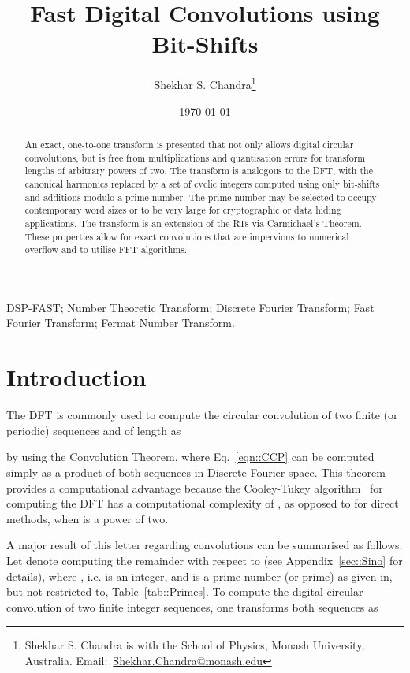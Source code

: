 \documentclass[twocolumn]{IEEEtran}
\title{Fast Digital Convolutions using Bit-Shifts}
\author{Shekhar S. Chandra\thanks{Shekhar S. Chandra is with the School of Physics, Monash University, Australia. Email:~\href{mailto:Shekhar.Chandra@monash.edu}{Shekhar.Chandra@monash.edu}}}
\date{\today}
\newcommand{\eqnTag}{Eq.}
\newcommand{\tabTag}{Table}
\begin{document}
\maketitle
\acresetall

\begin{abstract}
An exact, one-to-one transform is presented that not only allows digital circular convolutions, but is free from multiplications and quantisation errors for transform lengths of arbitrary powers of two. The transform is analogous to the \acl{DFT}, with the canonical harmonics replaced by a set of cyclic integers computed using only bit-shifts and additions modulo a prime number. The prime number may be selected to occupy contemporary word sizes or to be very large for cryptographic or data hiding applications. The transform is an extension of the \aclp{RT} via Carmichael's Theorem. These properties allow for exact convolutions that are impervious to numerical overflow and to utilise \acl{FFT} algorithms.









\end{abstract}

\begin{IEEEkeywords}
DSP-FAST; Number Theoretic Transform; Discrete Fourier Transform; Fast Fourier Transform; Fermat Number Transform.
\end{IEEEkeywords}

\acresetall \section{Introduction}\label{sec::Intro}
The \ac{DFT} is commonly used to compute the circular convolution  of two finite (or periodic) sequences  and  of length  as

by using the Convolution Theorem, where \eqnTag~\eqref{eqn::CCP} can be computed simply as a product of both sequences in Discrete Fourier space. This theorem provides a computational advantage because the Cooley-Tukey algorithm~\citep{Cooley1965} for computing the \ac{DFT} has a computational complexity of , as opposed to  for direct methods, when  is a power of two.

A major result of this letter regarding convolutions can be summarised as follows. Let  denote computing the remainder with respect to  (see Appendix~\ref{sec::Sino} for details), where , i.e.  is an integer, and  is a prime number (or prime) as given in, but not restricted to, \tabTag~\ref{tab::Primes}. To compute the digital circular convolution of two finite integer sequences, one transforms both sequences as
\end{document}
